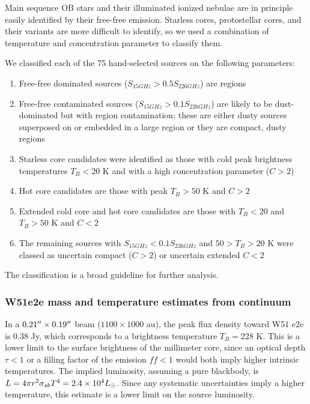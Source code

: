 \documentclass{aa}
\begin{document}
Main sequence OB stars and their illuminated ionized nebulae are in principle
easily identified by their free-free emission.  Starless cores, protostellar
cores, and their variants are more difficult to identify, so we used a combination
of temperature and concentration parameter to classify them.

We classified each of the 75 hand-selected sources on the following parameters:
\begin{enumerate}
    \item Free-free dominated sources ($S_{15 GHz} > 0.5 S_{226 GHz}$) are \hii
        regions
    \item Free-free contaminated sources ($S_{15 GHz} > 0.1 S_{226 GHz}$) are
        likely to be dust-dominated but with \hii region contamination; these
        are either dusty sources superposed on or embedded in a large \hii
        region or they are compact, dusty \hii regions
    \item Starless core candidates were identified as those with cold peak
        brightness temperatures $T_B < 20$ K and with a high concentration
        parameter ($C>2$)
    \item Hot core candidates are those with peak $T_B>50$ K and $C>2$
    \item Extended cold core and hot core candidates are those with $T_B<20$ 
        and $T_B>50$ K and $C<2$
    \item The remaining sources with $S_{15 GHz} < 0.1 S_{226 GHz}$ and $50 >
        T_B > 20$ K were classed as uncertain compact ($C>2$) or uncertain extended
        $C<2$
\end{enumerate}

The classification is a broad guideline for further analysis.   









\subsubsection{W51e2e mass and temperature estimates from continuum}
\label{sec:W51e2e}

In a $0.21\mbox{$^{\prime\prime}$}\times0.19\mbox{$^{\prime\prime}$}$ beam ($1100\times1000$ au), the peak flux
density toward W51 e2e is 0.38 Jy, which corresponds to a brightness
temperature $T_B=228$ K.  This is a lower limit to the surface brightness of
the millimeter core, since an optical depth $\tau<1$ or a filling factor of the
emission $ff<1$ would both imply higher intrinsic temperatures.  The implied
luminosity, assuming a pure blackbody, is $L = 4\pi r^2 \sigma_{sb} T^4 =
2.4\times10^{4} L_{\odot}$.  Since any systematic uncertainties imply a higher
temperature, this estimate is a lower limit on the source luminosity.
\end{document}
